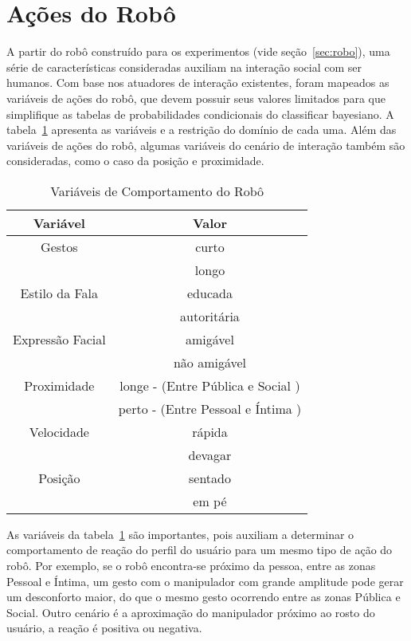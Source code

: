 \section{Ações do Robô}
\label{sec:comportamento-robo}
A partir do robô construído para os experimentos (vide seção~\ref{sec:robo}), uma série de características consideradas auxiliam na interação social com ser humanos. Com base nos atuadores de interação existentes, foram mapeados as variáveis de ações do robô, que devem possuir seus valores limitados para que simplifique as tabelas de probabilidades condicionais do classificar bayesiano. A tabela~\ref{tab:variaveisvalores} apresenta as variáveis e a restrição do domínio de cada uma. Além das variáveis de ações do robô, algumas variáveis do cenário de interação também são consideradas, como o caso da posição e proximidade.

\begin{table}[!ht]
	\caption{Variáveis de Comportamento do Robô}
	\label{tab:variaveisvalores}
	\centering
	\begin{tabular}{c | c}
		\hline
		Variável & Valor \\
		\hline
		Gestos & curto \\
		& longo \\
		\hline
		Estilo da Fala & educada \\
		& autoritária \\
		\hline
		Expressão Facial & amigável \\
		& não amigável \\
		\hline
		Proximidade & longe - (Entre Pública e Social ) \\
		& perto - (Entre Pessoal e Íntima ) \\
		\hline
		Velocidade & rápida \\
		& devagar \\
		\hline
		Posição & sentado \\
		& em pé \\
		\hline
	\end{tabular}
\end{table}

As variáveis da tabela~\ref{tab:variaveisvalores} são importantes, pois auxiliam a determinar o comportamento de reação do perfil do usuário para um mesmo tipo de ação do robô. Por exemplo, se o robô encontra-se próximo da pessoa, entre as zonas Pessoal e Íntima, um gesto com o manipulador com grande amplitude pode gerar um desconforto maior, do que o mesmo gesto ocorrendo entre as zonas Pública e Social. Outro cenário é a aproximação do manipulador próximo ao rosto do usuário, a reação é positiva ou negativa.

